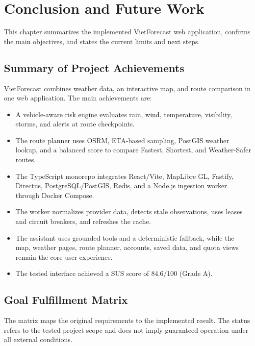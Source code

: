 \chapter{Conclusion and Future Work}
\label{ch:conclusion}

This chapter summarizes the implemented VietForecast web application, confirms the main objectives, and states the current limits and next steps.

\section{Summary of Project Achievements}
\label{sec:summary_achievements}

VietForecast combines weather data, an interactive map, and route comparison in one web application. The main achievements are:

\begin{itemize}
    \item[-] A vehicle-aware risk engine evaluates rain, wind, temperature, visibility, storms, and alerts at route checkpoints.
    \item[-] The route planner uses OSRM, ETA-based sampling, PostGIS weather lookup, and a balanced score to compare Fastest, Shortest, and Weather-Safer routes.
    \item[-] The TypeScript monorepo integrates React/Vite, MapLibre GL, Fastify, Directus, PostgreSQL/PostGIS, Redis, and a Node.js ingestion worker through Docker Compose.
    \item[-] The worker normalizes provider data, detects stale observations, uses leases and circuit breakers, and refreshes the cache.
    \item[-] The assistant uses grounded tools and a deterministic fallback, while the map, weather pages, route planner, accounts, saved data, and quota views remain the core user experience.
    \item[-] The tested interface achieved a SUS score of 84.6/100 (Grade A).
\end{itemize}

\section{Goal Fulfillment Matrix}
\label{sec:goal_fulfillment_matrix}

The matrix maps the original requirements to the implemented result. The status refers to the tested project scope and does not imply guaranteed operation under all external conditions.

